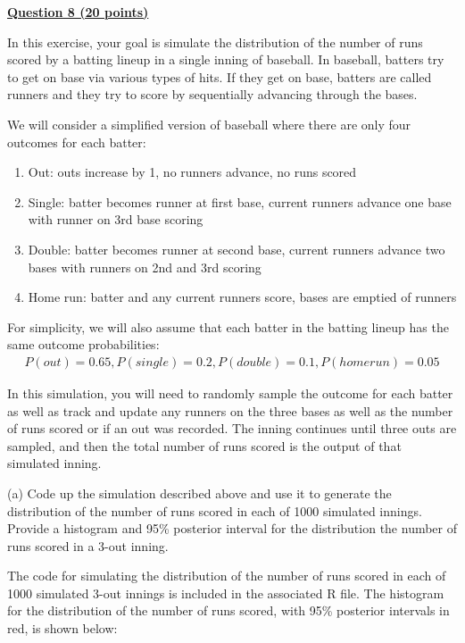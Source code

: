 \documentclass[12pt]{article}
\begin{document}
\bigskip

{\underline{\bf Question 8 (20 points)}}  

In this exercise, your goal is simulate the distribution of the number of runs scored by a batting lineup in a single inning of baseball.  In baseball, batters try to get on base via various types of hits.  If they get on base, batters are called runners and they try to score by sequentially advancing through the bases. 

We will consider a simplified version of baseball where there are only four outcomes for each batter:
\begin{enumerate} 
\item Out: outs increase by 1, no runners advance, no runs scored
\item Single: batter becomes runner at first base, current runners advance one base with runner on 3rd base scoring
\item Double: batter becomes runner at second base, current runners advance two bases with runners on 2nd and 3rd scoring
\item Home run: batter and any current runners score, bases are emptied of runners
\end{enumerate}

For simplicity, we will also assume that each batter in the batting lineup has the same outcome probabilities: 
\begin{eqnarray*}
P(out)  =  0.65, P(single)  =  0.2, P(double)  =  0.1, P(homerun)  =  0.05
\end{eqnarray*}

In this simulation, you will need to randomly sample the outcome for each batter as well as track and update any runners on the three bases as well as the number of runs scored or if an out was recorded.  The inning continues until three outs are sampled, and then the total number of runs scored is the output of that simulated inning.

(a) Code up the simulation described above and use it to generate the distribution of the number of runs scored in each of 1000 simulated innings.  Provide a histogram and 95\% posterior interval for the distribution the number of runs scored in a 3-out inning.  

The code for simulating the distribution of the number of runs scored in each of 1000 simulated 3-out innings
is included in the associated R file. The histogram for the distribution of the number of runs scored,
with 95\% posterior intervals in red, is shown below:
\end{document}
